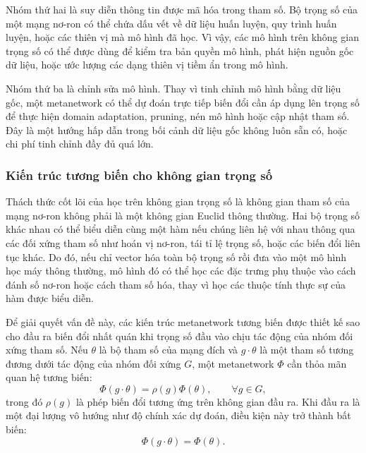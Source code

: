 Nhóm thứ hai là suy diễn thông tin được mã hóa trong tham số. Bộ trọng số của một mạng nơ-ron có thể chứa dấu vết về dữ liệu huấn luyện, quy trình huấn luyện, hoặc các thiên vị mà mô hình đã học. Vì vậy, các mô hình trên không gian trọng số có thể được dùng để kiểm tra bản quyền mô hình, phát hiện nguồn gốc dữ liệu, hoặc ước lượng các dạng thiên vị tiềm ẩn trong mô hình.

Nhóm thứ ba là chỉnh sửa mô hình. Thay vì tinh chỉnh mô hình bằng dữ liệu gốc, một metanetwork có thể dự đoán trực tiếp biến đổi cần áp dụng lên trọng số để thực hiện domain adaptation, pruning, nén mô hình hoặc cập nhật tham số. Đây là một hướng hấp dẫn trong bối cảnh dữ liệu gốc không luôn sẵn có, hoặc chi phí tinh chỉnh đầy đủ quá lớn.

\subsubsection{Kiến trúc tương biến cho không gian trọng số}

Thách thức cốt lõi của học trên không gian trọng số là không gian tham số của mạng nơ-ron không phải là một không gian Euclid thông thường. Hai bộ trọng số khác nhau có thể biểu diễn cùng một hàm nếu chúng liên hệ với nhau thông qua các đối xứng tham số như hoán vị nơ-ron, tái tỉ lệ trọng số, hoặc các biến đổi liên tục khác. Do đó, nếu chỉ vector hóa toàn bộ trọng số rồi đưa vào một mô hình học máy thông thường, mô hình đó có thể học các đặc trưng phụ thuộc vào cách đánh số nơ-ron hoặc cách tham số hóa, thay vì học các thuộc tính thực sự của hàm được biểu diễn.

Để giải quyết vấn đề này, các kiến trúc metanetwork tương biến được thiết kế sao cho đầu ra biến đổi nhất quán khi trọng số đầu vào chịu tác động của nhóm đối xứng tham số. Nếu $\theta$ là bộ tham số của mạng đích và $g \cdot \theta$ là một tham số tương đương dưới tác động của nhóm đối xứng $G$, một metanetwork $\Phi$ cần thỏa mãn quan hệ tương biến:
\begin{equation}
    \Phi(g \cdot \theta)
    =
    \rho(g)\Phi(\theta),
    \qquad \forall g \in G,
    \label{eq:weight-space-equivariance}
\end{equation}
trong đó $\rho(g)$ là phép biến đổi tương ứng trên không gian đầu ra. Khi đầu ra là một đại lượng vô hướng như độ chính xác dự đoán, điều kiện này trở thành bất biến:
\begin{equation}
    \Phi(g \cdot \theta)
    =
    \Phi(\theta).
    \label{eq:weight-space-invariance}
\end{equation}

